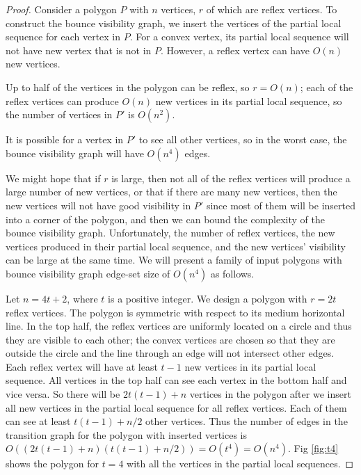 \documentclass[]{styles/svproc}  %
\begin{document}
\begin{proof}
Consider a polygon $P$ with $n$ vertices, $r$ of which are reflex vertices. To
construct the bounce visibility graph, we insert the vertices of the partial
local sequence for each vertex in $P$. For a convex vertex, its partial local sequence will not have new vertex that is not
in $P$. However, a reflex vertex can have $O(n)$ new vertices. 

Up to half of the vertices in the polygon can be reflex, so $r = O(n)$; each 
of the reflex vertices can produce $O(n)$ new vertices in its partial local 
sequence, so the number of vertices in $P'$ is $O(n^2)$. 

It is possible for a vertex in $P'$ to see all other vertices, so in the worst
case, the bounce visibility graph will have $O(n^4)$ edges.

We might hope that if $r$ is large, then not all of the reflex vertices will
produce a large number of new vertices, or that if there are many new vertices,
then the new vertices will not have good visibility in $P'$ since most of them
will be inserted into a corner of the polygon, and then we can bound the
complexity of the bounce visibility graph. Unfortunately, the number of reflex
vertices, the new vertices produced in their partial local sequence, and the new
vertices' visibility can be large at the same time. We will present a family of
input polygons with bounce visibility graph edge-set size of $O(n^4)$ as
follows.

Let $n = 4t+2$, where $t$ is a positive integer. We design a polygon with
$r = 2t$ reflex vertices. The polygon is symmetric with respect to its medium
horizontal line. In the top half, the reflex vertices are uniformly located on a
circle and thus they are visible to each other; the convex vertices are chosen
so that they are outside the circle and the line through an edge will not
intersect other edges. Each reflex vertex will have at least $t-1$ new
vertices in its partial local sequence. All vertices in the top half can see
each vertex in the bottom half and vice versa. So there will be $2t(t-1)+n$
vertices in the polygon after we insert all new vertices in the partial local
sequence for all reflex vertices. Each of them can see at least $t(t-1)+n/2$
other vertices. Thus the number of edges in the transition graph for the
polygon with inserted vertices is
$O ((2t(t-1)+n)(t(t-1)+n/2)) = O(t^4) = O(n^4)$.
Fig \ref{fig:t4} shows the polygon for $t = 4$ with all the
vertices in the partial local sequences. %

\end{proof}
\end{document}
